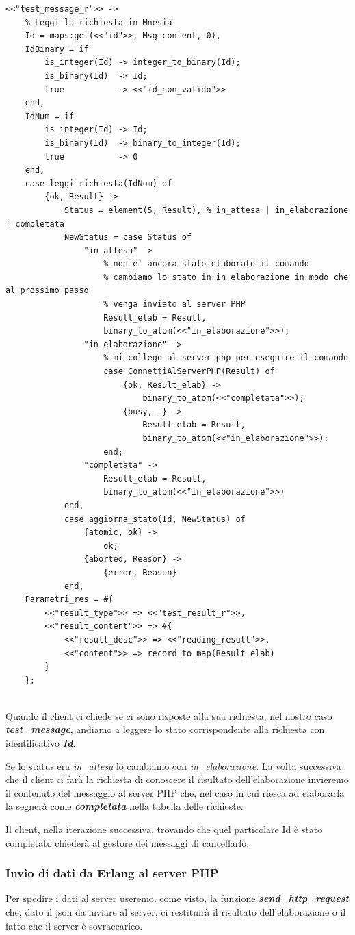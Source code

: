\begin{verbatim}
<<"test_message_r">> ->
	% Leggi la richiesta in Mnesia
	Id = maps:get(<<"id">>, Msg_content, 0),
	IdBinary = if
		is_integer(Id) -> integer_to_binary(Id);
		is_binary(Id)  -> Id;
		true           -> <<"id_non_valido">>
	end,
	IdNum = if
		is_integer(Id) -> Id;
		is_binary(Id)  -> binary_to_integer(Id);
		true           -> 0
	end,
	case leggi_richiesta(IdNum) of
		{ok, Result} ->
			Status = element(5, Result), % in_attesa | in_elaborazione | completata
			NewStatus = case Status of
				"in_attesa" -> 
					% non e' ancora stato elaborato il comando
					% cambiamo lo stato in in_elaborazione in modo che al prossimo passo
					% venga inviato al server PHP
					Result_elab = Result,
					binary_to_atom(<<"in_elaborazione">>);
				"in_elaborazione" -> 
					% mi collego al server php per eseguire il comando
					case ConnettiAlServerPHP(Result) of
						{ok, Result_elab} -> 
							binary_to_atom(<<"completata">>);
						{busy, _} -> 
							Result_elab = Result,
							binary_to_atom(<<"in_elaborazione">>);
					end;
				"completata" -> 
					Result_elab = Result,
					binary_to_atom(<<"in_elaborazione">>)
			end,
			case aggiorna_stato(Id, NewStatus) of
				{atomic, ok} ->
					ok;
				{aborted, Reason} ->
					{error, Reason}
			end,
	Parametri_res = #{
		<<"result_type">> => <<"test_result_r">>,
		<<"result_content">> => #{
			<<"result_desc">> => <<"reading_result">>,
			<<"content">> => record_to_map(Result_elab)
		}
	};
	
\end{verbatim}

Quando il client ci chiede se ci sono risposte alla sua richiesta, nel nostro caso \textbf{\textit{test\_message}}, andiamo a leggere lo stato corrispondente alla richiesta con identificativo \textit{\textbf{Id}}.

Se lo status era \textit{in\_attesa} lo cambiamo con \textit{in\_elaborazione}.
La volta successiva che il client ci far\`a la richiesta di conoscere il risultato dell'elaborazione invieremo il contenuto del messaggio al server PHP che, nel caso in cui riesca ad elaborarla la segner\`a come \textit{\textbf{completata}} nella tabella delle richieste.

Il client, nella iterazione successiva, trovando che quel particolare Id \`e stato completato chieder\`a al gestore dei messaggi di cancellarlo. 

\subsubsection{Invio di dati da Erlang al server PHP}
 Per spedire i dati al server useremo, come visto, la funzione \textbf{\textit{send\_http\_request}} che, dato il json da inviare al server, ci restituir\`a il risultato dell'elaborazione o il fatto che il server \`e sovraccarico.
 
